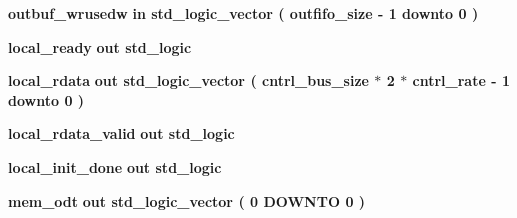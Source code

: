 \begin{DoxyCompactItemize}
\item 
{\bf outbuf\+\_\+wrusedw}  {\bfseries {\bfseries \textcolor{keywordflow}{in}\textcolor{vhdlchar}{ }}} {\bfseries \textcolor{comment}{std\+\_\+logic\+\_\+vector}\textcolor{vhdlchar}{ }\textcolor{vhdlchar}{(}\textcolor{vhdlchar}{ }\textcolor{vhdlchar}{ }\textcolor{vhdlchar}{ }\textcolor{vhdlchar}{ }{\bfseries {\bf outfifo\+\_\+size}} \textcolor{vhdlchar}{-\/}\textcolor{vhdlchar}{ } \textcolor{vhdldigit}{1} \textcolor{vhdlchar}{ }\textcolor{keywordflow}{downto}\textcolor{vhdlchar}{ }\textcolor{vhdlchar}{ } \textcolor{vhdldigit}{0} \textcolor{vhdlchar}{ }\textcolor{vhdlchar}{)}\textcolor{vhdlchar}{ }} 
\item 
{\bf local\+\_\+ready}  {\bfseries {\bfseries \textcolor{keywordflow}{out}\textcolor{vhdlchar}{ }}} {\bfseries \textcolor{comment}{std\+\_\+logic}\textcolor{vhdlchar}{ }} 
\item 
{\bf local\+\_\+rdata}  {\bfseries {\bfseries \textcolor{keywordflow}{out}\textcolor{vhdlchar}{ }}} {\bfseries \textcolor{comment}{std\+\_\+logic\+\_\+vector}\textcolor{vhdlchar}{ }\textcolor{vhdlchar}{(}\textcolor{vhdlchar}{ }\textcolor{vhdlchar}{ }\textcolor{vhdlchar}{ }\textcolor{vhdlchar}{ }{\bfseries {\bf cntrl\+\_\+bus\+\_\+size}} \textcolor{vhdlchar}{$\ast$}\textcolor{vhdlchar}{ } \textcolor{vhdldigit}{2} \textcolor{vhdlchar}{$\ast$}\textcolor{vhdlchar}{ }\textcolor{vhdlchar}{ }\textcolor{vhdlchar}{ }{\bfseries {\bf cntrl\+\_\+rate}} \textcolor{vhdlchar}{-\/}\textcolor{vhdlchar}{ } \textcolor{vhdldigit}{1} \textcolor{vhdlchar}{ }\textcolor{keywordflow}{downto}\textcolor{vhdlchar}{ }\textcolor{vhdlchar}{ } \textcolor{vhdldigit}{0} \textcolor{vhdlchar}{ }\textcolor{vhdlchar}{)}\textcolor{vhdlchar}{ }} 
\item 
{\bf local\+\_\+rdata\+\_\+valid}  {\bfseries {\bfseries \textcolor{keywordflow}{out}\textcolor{vhdlchar}{ }}} {\bfseries \textcolor{comment}{std\+\_\+logic}\textcolor{vhdlchar}{ }} 
\item 
{\bf local\+\_\+init\+\_\+done}  {\bfseries {\bfseries \textcolor{keywordflow}{out}\textcolor{vhdlchar}{ }}} {\bfseries \textcolor{comment}{std\+\_\+logic}\textcolor{vhdlchar}{ }} 
\item 
{\bf mem\+\_\+odt}  {\bfseries {\bfseries \textcolor{keywordflow}{out}\textcolor{vhdlchar}{ }}} {\bfseries \textcolor{comment}{std\+\_\+logic\+\_\+vector}\textcolor{vhdlchar}{ }\textcolor{vhdlchar}{(}\textcolor{vhdlchar}{ }\textcolor{vhdlchar}{ } \textcolor{vhdldigit}{0} \textcolor{vhdlchar}{ }\textcolor{keywordflow}{D\+O\+W\+N\+TO}\textcolor{vhdlchar}{ }\textcolor{vhdlchar}{ } \textcolor{vhdldigit}{0} \textcolor{vhdlchar}{ }\textcolor{vhdlchar}{)}\textcolor{vhdlchar}{ }} 

\end{DoxyCompactItemize}
